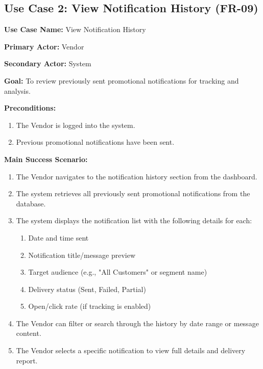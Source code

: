 \subsection*{Use Case 2: View Notification History (FR-09)}

\textbf{Use Case Name:} View Notification History

\textbf{Primary Actor:} Vendor

\textbf{Secondary Actor:} System

\textbf{Goal:} To review previously sent promotional notifications for tracking and analysis.

\textbf{Preconditions:}
\begin{enumerate}
    \item The Vendor is logged into the system.
    \item Previous promotional notifications have been sent.
\end{enumerate}

\textbf{Main Success Scenario:}
\begin{enumerate}
    \item The Vendor navigates to the notification history section from the dashboard.
    \item The system retrieves all previously sent promotional notifications from the database.
    \item The system displays the notification list with the following details for each:
    \begin{enumerate}
        \item Date and time sent
        \item Notification title/message preview
        \item Target audience (e.g., "All Customers" or segment name)
        \item Delivery status (Sent, Failed, Partial)
        \item Open/click rate (if tracking is enabled)
    \end{enumerate}
    \item The Vendor can filter or search through the history by date range or message content.
    \item The Vendor selects a specific notification to view full details and delivery report.
\end{enumerate}

